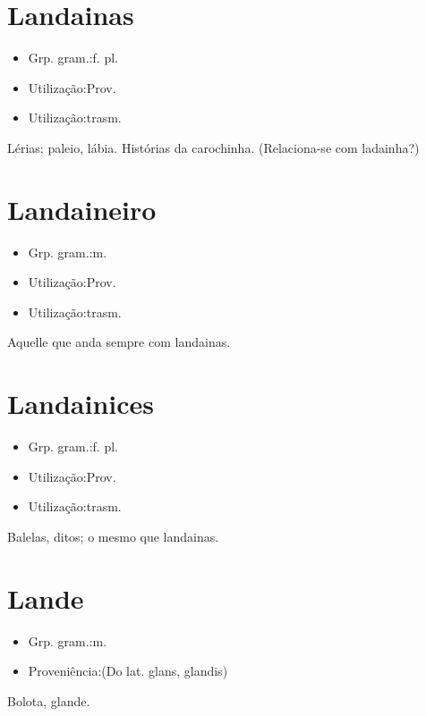 \section{Landainas}
\begin{itemize}
\item {Grp. gram.:f. pl.}
\end{itemize}
\begin{itemize}
\item {Utilização:Prov.}
\end{itemize}
\begin{itemize}
\item {Utilização:trasm.}
\end{itemize}
Lérias; paleio, lábia.
Histórias da carochinha.
(Relaciona-se com \textunderscore ladainha\textunderscore ?)
\section{Landaineiro}
\begin{itemize}
\item {Grp. gram.:m.}
\end{itemize}
\begin{itemize}
\item {Utilização:Prov.}
\end{itemize}
\begin{itemize}
\item {Utilização:trasm.}
\end{itemize}
Aquelle que anda sempre com landainas.
\section{Landainices}
\begin{itemize}
\item {Grp. gram.:f. pl.}
\end{itemize}
\begin{itemize}
\item {Utilização:Prov.}
\end{itemize}
\begin{itemize}
\item {Utilização:trasm.}
\end{itemize}
Balelas, ditos; o mesmo que \textunderscore landainas\textunderscore .
\section{Lande}
\begin{itemize}
\item {Grp. gram.:m.}
\end{itemize}
\begin{itemize}
\item {Proveniência:(Do lat. \textunderscore glans\textunderscore , \textunderscore glandis\textunderscore )}
\end{itemize}
Bolota, glande.
